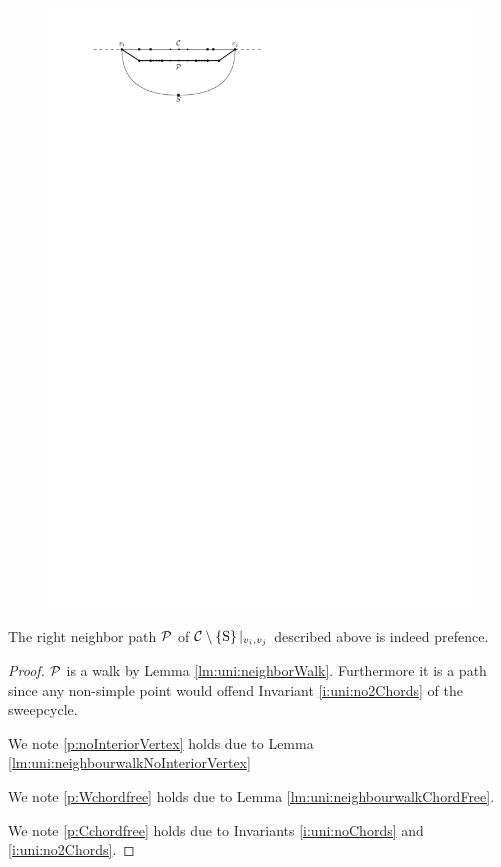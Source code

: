     \begin{figure}[h]
      \centering
      \includegraphics[scale=1]{unifiedAlgo/img/sweep/rightNeighbourWalk}
      \caption{}
      \label{fig:sweep:rightNeighbourwalk}
    \end{figure}

    \begin{lemma}
      \label{lm:uni:isPrefence}
      The right neighbor path $\P$ of $\cpath|_{v_i, v_j}$ described above is indeed prefence.
    \end{lemma}
    \begin{proof}
      $\P$ is a walk by Lemma \ref{lm:uni:neighborWalk}. Furthermore it is a path since any non-simple point would offend Invariant \ref{i:uni:no2Chords} of the sweepcycle.


      We note \ref{p:noInteriorVertex} holds due to Lemma \ref{lm:uni:neighbourwalkNoInteriorVertex}

      We note \ref{p:Wchordfree} holds due to Lemma \ref{lm:uni:neighbourwalkChordFree}.

      We note \ref{p:Cchordfree} holds due to Invariants \ref{i:uni:noChords} and \ref{i:uni:no2Chords}.
    \end{proof}

